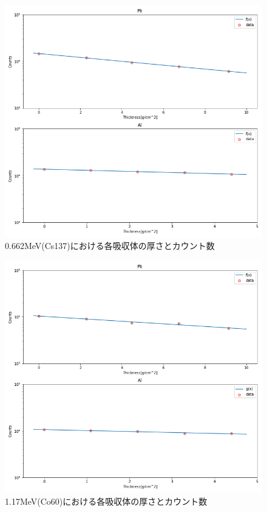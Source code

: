 \documentclass[a4paper,12pt]{jarticle}
\begin{document}
  \begin{figure}[htbp]
   \begin{center}
   \includegraphics[clip,width=14.0cm]{Cs137.png}
    \caption{0.662MeV(Cs137)における各吸収体の厚さとカウント数}
    \label{fig:Cs137}
   \end{center}
  \end{figure}

  \begin{figure}[htbp]
   \begin{center}
   \includegraphics[clip,width=14.0cm]{Co60_left.png}
    \caption{1.17MeV(Co60)における各吸収体の厚さとカウント数}
    \label{fig:Co60_left}
   \end{center}
  \end{figure}
\end{document}
